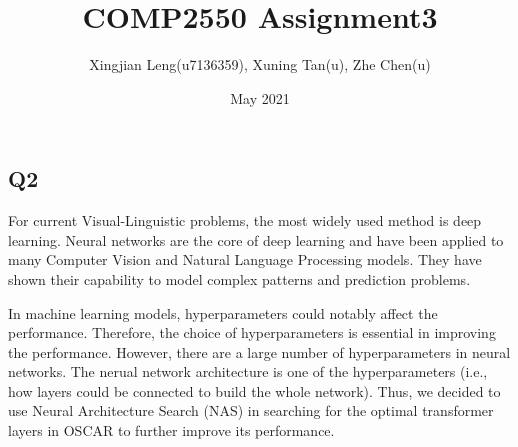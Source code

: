 \documentclass[12pt, a4paper]{article}
\title{COMP2550 Assignment3}
\author{Xingjian Leng(u7136359), Xuning Tan(u), Zhe Chen(u)}
\date{May 2021}
\begin{document}
    
\maketitle

\subsection*{Q2}

\par\noindent For current Visual-Linguistic problems, the most widely used method is deep learning. Neural networks are the core of deep learning and have been applied to many Computer Vision and Natural Language Processing models. They have shown their capability to model complex patterns and prediction problems.


\par\noindent \newline In machine learning models, hyperparameters could notably affect the performance. Therefore, the choice of hyperparameters is essential in improving the performance. However, there are a large number of hyperparameters in neural networks. The nerual network architecture is one of the hyperparameters (i.e., how layers could be connected to build the whole network). Thus, we decided to use Neural Architecture Search (NAS) in searching for the optimal transformer layers in OSCAR to further improve its performance.

\par\noindent \newline
\end{document}
